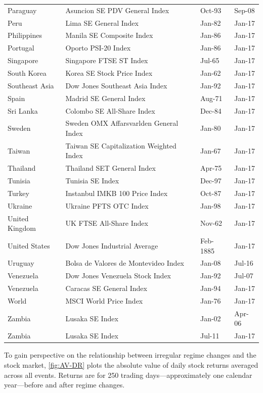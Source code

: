 \documentclass[12pt,final,fleqn]{article}
\theoremstyle{plain}
\begin{document}
\begin{table}[!ht]
\begin{center}
\begin{threeparttable}
\begin{tabular*}{\textwidth}{l@{\extracolsep{\fill}}lll}
Paraguay & Asuncion SE PDV General Index & Oct-93 & Sep-08\\
Peru & Lima SE General Index & Jan-82 & Jan-17\\
Philippines & Manila SE Composite Index & Jan-86 & Jan-17\\
Portugal & Oporto PSI-20 Index & Jan-86 & Jan-17\\
Singapore & Singapore FTSE ST Index & Jul-65 & Jan-17\\
South Korea & Korea SE Stock Price Index  & Jan-62 & Jan-17\\
Southeast Asia & Dow Jones Southeast Asia Index & Jan-92 & Jan-17\\
Spain & Madrid SE General Index & Aug-71 & Jan-17\\
Sri Lanka & Colombo SE All-Share Index & Dec-84 & Jan-17\\
Sweden & Sweden OMX Affarsvarlden General Index & Jan-80 & Jan-17\\
Taiwan & Taiwan SE Capitalization Weighted Index & Jan-67 & Jan-17\\
Thailand & Thailand SET General Index & Apr-75 & Jan-17\\
Tunisia & Tunisia SE Index & Dec-97 & Jan-17\\
Turkey & Instanbul IMKB 100 Price Index & Oct-87 & Jan-17\\
Ukraine & Ukraine PFTS OTC Index & Jan-98 & Jan-17\\
United Kingdom & UK FTSE All-Share Index & Nov-62 & Jan-17\\
United States & Dow Jones Industrial Average & Feb-1885 & Jan-17\\
Uruguay & Bolsa de Valores de Montevideo Index & Jan-08 & Jul-16\\
Venezuela & Dow Jones Venezuela Stock Index & Jan-92 & Jul-07\\
Venezuela & Caracas SE General Index & Jan-94 & Jan-17\\
World & MSCI World Price Index & Jan-76 & Jan-17\\
Zambia & Lusaka SE Index & Jan-02 & Apr-06\\
Zambia & Lusaka SE Index & Jul-11 & Jan-17\\
   \hline
   \hline
\end{tabular*}
\end{threeparttable}
\end{center}
\end{table}

To gain perspective on the relationship between irregular regime changes and the stock market, \autoref{fig:AV-DR} plots the absolute value of daily stock returns averaged across all events. Returns are for 250 trading days---approximately one calendar year---before and after regime changes.
\end{document}
